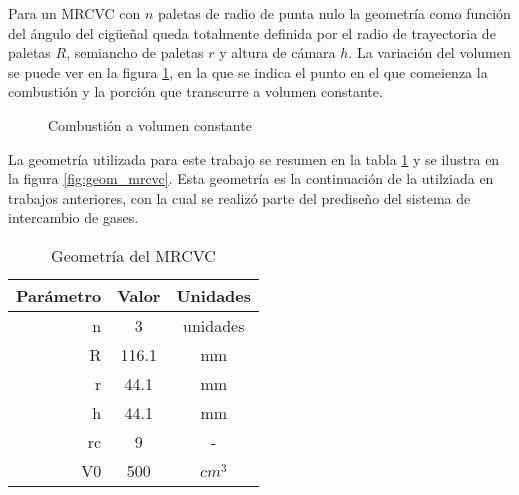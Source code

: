 %
Para un MRCVC con $n$ paletas de radio de punta nulo la geometría como función del
ángulo del cigüeñal queda totalmente definida por el radio de trayectoria de
paletas $R$, semiancho de paletas $r$ y altura de cámara $h$.
%
La variación del volumen se puede ver en la figura \ref{fig:vol_constante}, en
la que se indica el punto en el que comeienza la combustión y la porción que
transcurre a volumen constante.

\begin{figure}
    \centering
    \caption{Combustión a volumen constante}
    \label{fig:vol_constante}
\end{figure}

La geometría utilizada para este trabajo se resumen en la tabla
\ref{tab:geom_mrcvc} y se ilustra en la figura \ref{fig:geom_mrcvc}.
%
Esta geometría es la continuación de la utilziada en trabajos anteriores, con
la cual se realizó parte del prediseño del sistema de intercambio de gases.

\begin{table}
    \centering
    \begin{tabular}{rcc} \toprule
        Parámetro & Valor & Unidades \\ \midrule
        n & 3 & unidades \\
        R & 116.1 & mm \\
        r & 44.1 & mm \\
        h & 44.1 & mm \\
        rc & 9 & - \\
        V0 & 500 & $cm^3$ \\
    \end{tabular}
    \caption{Geometría del MRCVC}
    \label{tab:geom_mrcvc}
\end{table}


